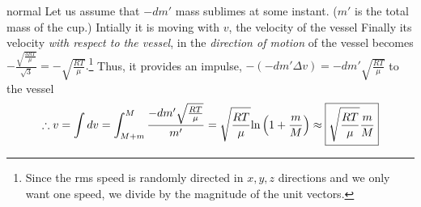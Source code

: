 \begin{solution}{normal}
Let us assume that $-dm'$ mass sublimes at some instant. ($m'$ is the total mass of the cup.)
Intially it is moving with $v$, the velocity of the vessel
Finally its velocity \textit{with respect to the vessel}, in the \textit{direction of motion} of the vessel becomes $-\frac{\sqrt {\frac{3RT}{\mu}}}{\sqrt 3}=-\sqrt{\frac{RT}{\mu}}.$\footnote{Since the rms speed is randomly directed in $x, y, z$ directions and we only want one speed, we divide by the magnitude of the unit vectors.}
Thus, it provides an impulse, $-(-dm' \Delta v )= -dm'\sqrt{\frac{RT}{\mu}}$ to the vessel
$$\therefore v = \int dv=\int_{M+m}^{M}\frac{-dm'\sqrt{\frac{RT}{\mu}}}{m'}=\sqrt{\frac{RT}{\mu}}\textup{ln}\left (1+\frac{m}{M}  \right )\approx \boxed{\sqrt{\frac{RT}{\mu}}\frac{m}{M}} $$
\end{solution}